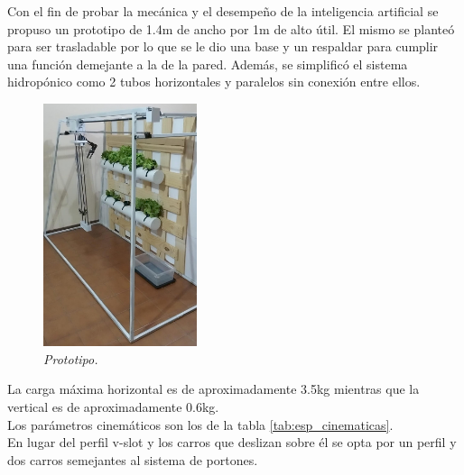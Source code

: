 Con el fin de probar la mecánica y el desempeño de la inteligencia artificial se propuso un prototipo de 1.4m de ancho por 1m de alto útil. El mismo se planteó para ser trasladable por lo que se le dio una base y un respaldar para cumplir una función demejante a la de la pared. Además, se simplificó el sistema hidropónico como 2 tubos horizontales y paralelos sin conexión entre ellos.
\begin{figure}[H]
    \centering
        \includegraphics[width=0.4\textwidth]{img/estructura.jpg}
        \caption{\textit{Prototipo.}}
        \label{fig:estructura}
\end{figure}
La carga máxima horizontal es de aproximadamente 3.5kg mientras que la vertical es de aproximadamente 0.6kg.\\
Los parámetros cinemáticos son los de la tabla \ref{tab:esp_cinematicas}.\\

En lugar del perfil v-slot y los carros que deslizan sobre él se opta por un perfil y dos carros semejantes al sistema de portones.\\

